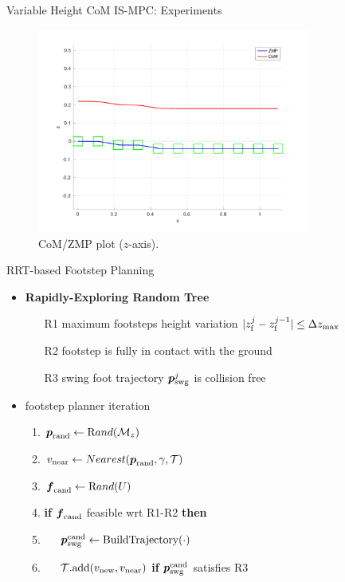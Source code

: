 \documentclass[10pt]{beamer}
\begin{document}
\begin{frame}{Variable Height CoM IS-MPC: Experiments}	
	\begin{figure}
		\centering
		\includegraphics[width=0.8\textwidth]
				{figures/experiments/multiple-staircases/downstairs/xz-plot-2cm.pdf}
		\caption{CoM/ZMP plot ($z$-axis).}
	\end{figure}
\end{frame}

\begin{frame}{RRT-based Footstep Planning}
  \begin{itemize}
    \item \textbf{Rapidly-Exploring Random Tree}
			\begin{itemize}
        \item[R1] maximum footsteps height variation
				    $|z_{\rm f}^j - z_{\rm f}^{j-1}| \le \Delta z_{\max}$
        \item[R2] footstep is fully in contact with the ground
        \item[R3] swing foot trajectory ${\mbox{\boldmath $p$}}_{\rm {swg}}^j$ is collision free
			\end{itemize}
    \item footstep planner iteration
			\begin{enumerate}
        \item ${\mbox{\boldmath $p$}}_{\rm rand} \leftarrow {\text Rand}(\mathcal{M}_z)$
				\item $v_{\rm near} \leftarrow Nearest({\mbox{\boldmath $p$}}_{\rm rand}, \gamma,
            \mathcal{T})$
        \item ${\mbox{\boldmath $f$}}_{\rm cand} \leftarrow {\text Rand}(U)$
				\item \textbf{if} ${\mbox{\boldmath $f$}}_{\rm cand}$ feasible wrt R1-R2 \textbf{then}
				\item $\quad$ ${\mbox{\boldmath $p$}}_{\rm swg}^{\rm cand}
						\leftarrow \text{BuildTrajectory}(\cdot)$
				\item $\quad$ $\mathcal{T}\text{.add}(v_{\rm new}, v_{\rm near})$
						\textbf{if} ${\mbox{\boldmath $p$}}_{\rm swg}^{\rm cand}$ satisfies R3
      \end{enumerate}
	\end{itemize}
\end{frame}
\end{document}
